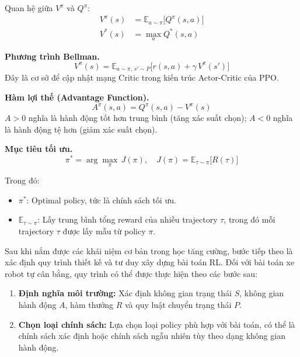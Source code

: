 \begin{itemize}
Quan hệ giữa $V^\pi$ và $Q^\pi$:
\begin{align}
    V^\pi(s) &= \mathbb{E}_{a\sim\pi}\bigl[Q^\pi(s,a)\bigr] \\
    V^*(s)   &= \max_a Q^*(s,a)
\end{align}

\textbf{Phương trình Bellman.}
\begin{equation}
    V^\pi(s) = \mathbb{E}_{a\sim\pi,\, s'\sim P}
    \bigl[r(s,a) + \gamma\, V^\pi(s')\bigr]
    \label{eq:bellman}
\end{equation}
Đây là cơ sở để cập nhật mạng Critic trong kiến trúc Actor-Critic của PPO.

\textbf{Hàm lợi thế (Advantage Function).}
\begin{equation}
    A^\pi(s,a) = Q^\pi(s,a) - V^\pi(s)
    \label{eq:advantage}
\end{equation}
$A > 0$ nghĩa là hành động tốt hơn trung bình (tăng xác suất chọn);
$A < 0$ nghĩa là hành động tệ hơn (giảm xác suất chọn).

\textbf{Mục tiêu tối ưu.}
\begin{equation}
    \pi^* = \arg\max_\pi\, J(\pi),
    \quad J(\pi) = \mathbb{E}_{\tau \sim \pi}\bigl[R(\tau)\bigr]
    \label{eq:rl_objective}
\end{equation}

Trong đó:
\begin{itemize}[leftmargin=1.5cm]
    \item $\pi^*$: Optimal policy, tức là chính sách tối ưu.
    \item $\mathbb{E}_{\tau \sim \pi}$: Lấy trung bình tổng reward của nhiều trajectory
    $\tau$, trong đó mỗi trajectory $\tau$ được lấy mẫu từ policy $\pi$.
\end{itemize}

Sau khi nắm được các khái niệm cơ bản trong học tăng cường, bước tiếp theo là xác định
quy trình thiết kế và tư duy xây dựng bài toán RL. Đối với bài toán xe robot tự cân bằng,
quy trình có thể được thực hiện theo các bước sau:

\begin{enumerate}[leftmargin=1.5cm]
    \item \textbf{Định nghĩa môi trường:} Xác định không gian trạng thái $S$,
    không gian hành động $A$, hàm thưởng $R$ và quy luật chuyển trạng thái $P$.

    \item \textbf{Chọn loại chính sách:} Lựa chọn loại policy phù hợp với bài toán,
    có thể là chính sách xác định hoặc chính sách ngẫu nhiên tùy theo dạng không gian
    hành động.


\end{enumerate}
\end{itemize}
